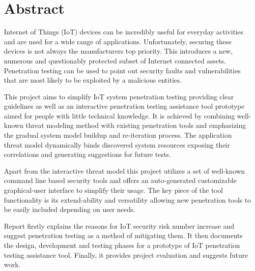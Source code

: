 


\section{Abstract}

Internet of Things (IoT) devices can be incredibly useful for everyday activities and are used for a wide range of applications. Unfortunately, securing these devices is not always the manufacturers top priority. This introduces a new, numerous and questionably protected subset of Internet connected assets. Penetration testing can be used to point out security faults and vulnerabilities that are most likely to be exploited by a malicious entities. 

This project aims to simplify IoT system penetration testing providing clear guidelines as well as an interactive penetration testing assistance tool prototype aimed for people with little technical knowledge. It is achieved by combining well-known threat modeling method with existing penetration tools and emphasizing the gradual system model buildup and re-iteration process. The application threat model dynamically binds discovered system resources exposing their correlations and generating suggestions for future tests.

Apart from the interactive threat model this project utilizes a set of well-known command line based security tools and offers an auto-generated customizable graphical-user interface to simplify their usage. The key piece of the tool functionality is its extend-ability and versatility allowing new penetration tools to be easily included depending on user needs.

Report firstly explains the reasons for IoT security risk number increase and suggest penetration testing as a method of mitigating them. It then documents the design, development and testing phases for a prototype of IoT penetration testing assistance tool. Finally, it provides project evaluation and suggests future work.